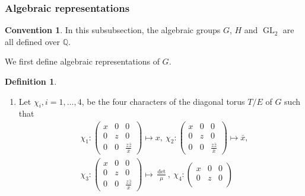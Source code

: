 \documentclass[11pt, a4paper]{amsart}
\theoremstyle{plain}
\theoremstyle{definition}
\newtheorem{definition}[theorem]{Definition}
\newtheorem{convention}[theorem]{Convention}
\numberwithin{equation}{section}
\def\QQ{\mathbb{Q}}
\DeclareMathOperator{\GL}{\mathrm{GL}}
\begin{document}
\subsubsection{Algebraic representations}

\begin{convention}
    In this subsubsection, the algebraic groups $G$, $H$ and $\GL_{2}$ are all defined over $\QQ$. 
\end{convention}

\par We first define algebraic representations of $G$. 

\begin{definition}
\label{def:rep_G}
    \begin{enumerate}
        \item Let $\chi_i,i = 1 ,\dots, 4$, be the four characters of the diagonal torus $T/E$ of $G$ such that 
        \begin{align*}
          &  \chi_1 \colon \begin{pmatrix}
                     x & 0 & 0 \\
                     0 & z & 0 \\
                     0 & 0 & \frac{z\bar{z}}{\bar{x}}
                   \end{pmatrix} \mapsto x,\  \chi_2 \colon \begin{pmatrix}
                                                     x & 0 & 0 \\
                                                     0 & z & 0 \\
                                                     0 & 0 & \frac{z\bar{z}}{\bar{x}}
                                                   \end{pmatrix} \mapsto \bar{x}, \\
          &  \chi_3 \colon \begin{pmatrix}
                     x & 0 & 0 \\
                     0 & z & 0 \\
                     0 & 0 & \frac{z\bar{z}}{\bar{x}}
                   \end{pmatrix} \mapsto \frac{\det}{\mu},\  \chi_4 \colon \begin{pmatrix}
                                                                        x & 0 & 0 \\
                                                                        0 & z & 0 \\

\end{pmatrix}
\end{align*}
\end{enumerate}
\end{definition}
\end{document}
